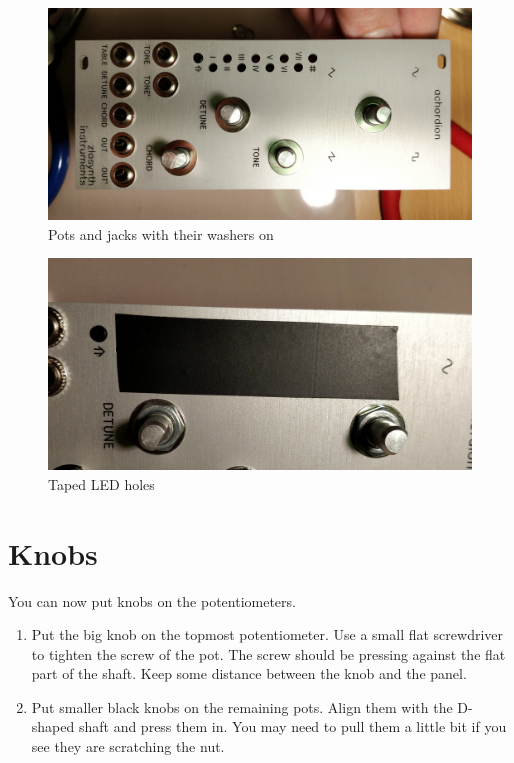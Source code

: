 \documentclass[10pt,a4paper,twocolumn]{article}
\begin{document}
\begin{figure}[p]
  \centering
  \includegraphics[width=\linewidth]{p08.jpg}
  \caption{Pots and jacks with their washers on}
  \label{washers}
\end{figure}

\begin{figure}[p]
  \centering
  \includegraphics[width=\linewidth]{p09.jpg}
  \caption{Taped LED holes}
  \label{masking}
\end{figure}

\clearpage

\section{Knobs}

You can now put knobs on the potentiometers.

\begin{enumerate}
  \item Put the big knob on the topmost potentiometer. Use a small flat screwdriver to tighten the screw of the pot. The screw should be pressing against the flat part of the shaft. Keep some distance between the knob and the panel.
  \item Put smaller black knobs on the remaining pots. Align them with the D-shaped shaft and press them in. You may need to pull them a little bit if you see they are scratching the nut.
\end{enumerate}
\end{document}
